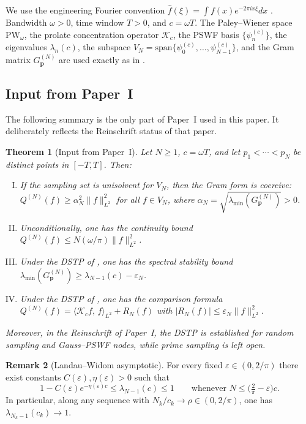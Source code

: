 \documentclass[12pt,a4paper]{amsart}
\newtheorem{theorem}{Theorem}[section]
\theoremstyle{definition}
\newtheorem{remark}[theorem]{Remark}
\newcommand{\PW}{\mathrm{PW}_\omega}
\newcommand{\Kop}{\mathcal{K}_c}
\newcommand{\GVM}{G^{(N)}_{\mathbf{p}}}
\newcommand{\psin}{\psi_n^{(c)}}
\newcommand{\norm}[1]{\|#1\|}
\newcommand{\ip}[2]{\langle #1,\, #2\rangle}
\begin{document}
We use the engineering Fourier convention
$\widehat{f}(\xi)=\int f(x)e^{-2\pi ix\xi}dx$ \cite{BonamiKaroui,PaperI}.
Bandwidth $\omega>0$, time window $T>0$, and $c=\omega T$.
The Paley--Wiener space $\PW$, the prolate concentration operator $\Kop$,
the PSWF basis $\{\psin\}$, the eigenvalues $\lambda_n(c)$, the subspace
$V_N=\mathrm{span}\{\psi_0^{(c)},\ldots,\psi_{N-1}^{(c)}\}$, and the Gram matrix
$\GVM$ are used exactly as in \cite{PaperI}.

\subsection{Input from Paper~I}

The following summary is the only part of Paper~I used in this paper.
It deliberately reflects the Reinschrift status of that paper.

\begin{theorem}[Input from Paper~I]\label{thm:paperI}
Let $N\geq1$, $c=\omega T$, and let $p_1<\cdots<p_N$ be distinct points in
$[-T,T]$. Then:
\begin{enumerate}[(I)]
\item If the sampling set is unisolvent for $V_N$, then the Gram form is coercive:
$Q^{(N)}(f)\geq \alpha_N^2\norm{f}_{L^2}^2$ for all $f\in V_N$, where
$\alpha_N=\sqrt{\lambda_{\min}(\GVM)}>0$.
\item Unconditionally, one has the continuity bound
$Q^{(N)}(f)\leq N(\omega/\pi)\norm{f}_{L^2}^2$.
\item Under the DSTP of \cite{PaperI}, one has the spectral stability bound
$\lambda_{\min}(\GVM)\geq\lambda_{N-1}(c)-\varepsilon_N$.
\item Under the DSTP of \cite{PaperI}, one has the comparison formula
$Q^{(N)}(f)=\ip{\Kop f}{f}_{L^2}+R_N(f)$ with
$|R_N(f)|\leq \varepsilon_N\norm{f}_{L^2}^2$.
\end{enumerate}
Moreover, in the Reinschrift of Paper~I, the DSTP is established for
random sampling and Gauss--PSWF nodes, while prime sampling is left open.
\end{theorem}

\begin{remark}[Landau--Widom asymptotic]\label{rem:LW}
For every fixed $\varepsilon\in(0,2/\pi)$ there exist constants
$C(\varepsilon),\eta(\varepsilon)>0$ such that
\[
  1-C(\varepsilon)e^{-\eta(\varepsilon)c}
  \le \lambda_{N-1}(c) \le 1
  \qquad\text{whenever } N\leq \bigl(\tfrac{2}{\pi}-\varepsilon\bigr)c.
\]
In particular, along any sequence with $N_k/c_k\to\rho\in(0,2/\pi)$,
one has $\lambda_{N_k-1}(c_k)\to1$.
\end{remark}
\end{document}
